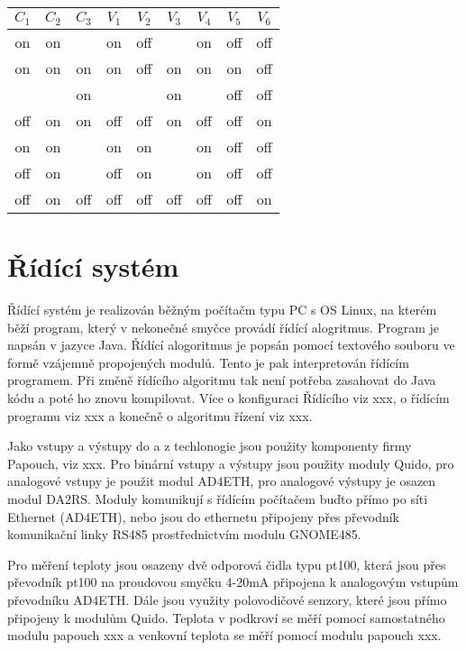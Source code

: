 \documentclass[a4paper,draft]{book}
\begin{document}
\begin{table}
      \centering
      \begin{tabular}{ccccccccc}
        $C_1$ & $C_2$ & $C_3$ & $V_1$ & $V_2$ & $V_3$ & $V_4$ & $V_5$ & $V_6$\\
        \hline
        on    & on    &       & on    & off   &       & on    & off   & off\\
        on    & on    & on    & on    & off   & on    & on    & on    & off\\
              &       & on    &       &       & on    &       & off   & off\\
        off   & on    & on    & off   & off   & on    & off   & off   & on\\
        on    & on    &       & on    & on    &       & on    & off   & off\\
        off   & on    &       & off   & on    &       & on    & off   & off\\
        off   & on    & off   & off   & off   & off   & off   & off   & on
      \end{tabular}
\end{table}

\chapter{Řídící systém}\label{chap:control}

    Řídící systém je realizován běžným počítačm typu PC s OS Linux, na kterém
    běží program, který v nekonečné smyčce provádí řídící alogritmus. Program
    je napsán v jazyce Java. Řídící alogoritmus je popsán pomocí textového
    souboru ve formě vzájemně propojených modulů. Tento je pak interpretován
    řídícím programem. Při změně řídícího algoritmu tak není potřeba zasahovat
    do Java kódu a poté ho znovu kompilovat. Více o konfiguraci Řídícího
    viz xxx, o řídícím programu viz xxx a konečně o algoritmu řízení viz xxx.

    Jako vstupy a výstupy do a z techlonogie jsou použity komponenty firmy
    Papouch, viz xxx. Pro binární vstupy a výstupy jsou použity moduly Quido,
    pro analogové vstupy je použit modul AD4ETH, pro analogové výstupy je
    osazen modul DA2RS. Moduly komunikují s řídícím počítačem buďto přímo
    po síti Ethernet (AD4ETH), nebo jsou do ethernetu připojeny přes převodník
    komunikační linky RS485 prostřednictvím modulu GNOME485.

    Pro měření teploty jsou osazeny dvě odporová čidla typu pt100, která jsou
    přes převodník pt100 na proudovou smyčku 4-20mA připojena k analogovým
    vstupům převodníku AD4ETH. Dále jsou využity polovodičové senzory, které
    jsou přímo připojeny k modulům Quido. Teplota v podkroví se měří pomocí
    samostatného modulu papouch xxx a venkovní teplota se měří pomocí modulu
    papouch xxx.
\end{document}
